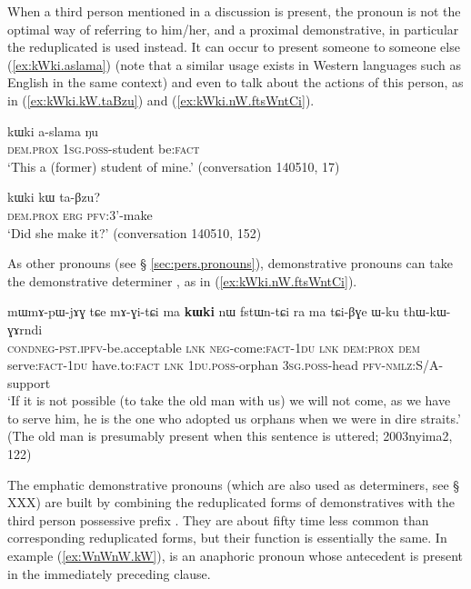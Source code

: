 When a third person mentioned in a discussion is present, the pronoun  is not the optimal way of referring to him/her, and a proximal demonstrative, in particular the reduplicated  is used instead. It can occur to present someone to someone else (\ref{ex:kWki.aslama}) (note that a similar usage exists in Western languages such as English in the same context) and even to talk about the actions of this person, as in  (\ref{ex:kWki.kW.taBzu}) and (\ref{ex:kWki.nW.ftsWntCi}).

\begin{exe}
\ex \label{ex:kWki.aslama}
 \gll kɯki a-slama ŋu \\
\textsc{dem.prox} \textsc{1sg.poss}-student be:\textsc{fact} \\
\glt `This a (former) student of mine.' (conversation 140510, 17)
\end{exe}

\begin{exe}
\ex \label{ex:kWki.kW.taBzu}
 \gll  kɯki kɯ ta-βzu? \\
 \textsc{dem.prox} \textsc{erg} \textsc{pfv}:3'-make \\
 \glt `Did she make it?' (conversation 140510, 152)
\end{exe}

As other pronouns (see § \ref{sec:pers.pronouns}), demonstrative pronouns can take the demonstrative determiner , as in (\ref{ex:kWki.nW.ftsWntCi}).

\begin{exe}
\ex \label{ex:kWki.nW.ftsWntCi}
 \gll mɯ\redp{}mɤ-pɯ-jɤɣ tɕe mɤ-ɣi-tɕi ma \textbf{kɯki} nɯ fstɯn-tɕi ra ma tɕi-βɣe ɯ-ku thɯ-kɯ-ɣɤrndi  \\
\textsc{cond}\redp{}\textsc{neg}-\textsc{pst}.\textsc{ipfv}-be.acceptable \textsc{lnk} \textsc{neg}-come:\textsc{fact}-\textsc{1du} \textsc{lnk} \textsc{dem:prox} \textsc{dem} serve:\textsc{fact}-\textsc{1du} have.to:\textsc{fact} \textsc{lnk} \textsc{1du.poss}-orphan \textsc{3sg.poss}-head \textsc{pfv}-\textsc{nmlz}:S/A-support \\
\glt `If it is not possible (to take the old man with us) we will not come, as we have to serve him, he is the one who adopted us orphans when we were in dire straits.' (The old man is presumably present when this sentence is uttered; 2003nyima2, 122)
\end{exe}

The emphatic demonstrative pronouns (which are also used as determiners, see § XXX) are built by combining the reduplicated forms of demonstratives with the third person possessive prefix . They are about fifty time less common than corresponding reduplicated forms, but their function is essentially the same. In example (\ref{ex:WnWnW.kW}),  is an anaphoric pronoun whose antecedent is present in the immediately preceding clause.

